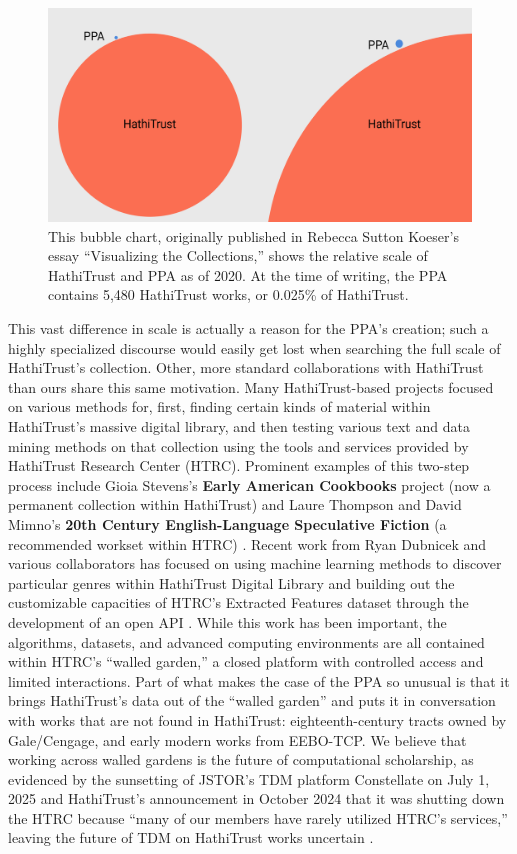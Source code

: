 \documentclass{anthology-ch}         %
\begin{document}
\begin{figure}
    \centering
    \includegraphics[width=0.75\linewidth]{figures/bubble-chart.png}
    \caption{This bubble chart, originally published in Rebecca Sutton Koeser’s essay “Visualizing the Collections,”\cite{koeser_visualizing_2020} shows the relative scale of HathiTrust and PPA as of 2020. At the time of writing, the PPA contains 5,480 HathiTrust works, or 0.025\% of HathiTrust. }
    \label{fig:bubble-chart}
\end{figure}
This vast difference in scale is actually a reason for the PPA’s creation; such a highly specialized discourse would easily get lost when searching the full scale of HathiTrust’s collection. Other, more standard collaborations with HathiTrust than ours share this same motivation. Many HathiTrust-based projects focused on various methods for, first, finding certain kinds of material within HathiTrust’s massive digital library, and then testing various text and data mining methods on that collection using the tools and services provided by HathiTrust Research Center (HTRC)\cite{noauthor_hathitrust_nodate}. Prominent examples of this two-step process include Gioia Stevens’s \textbf{Early American Cookbooks} project (now a permanent collection within HathiTrust) \cite{stevens_new_2017} and Laure Thompson and David Mimno’s \textbf{20th Century English-Language Speculative Fiction }(a recommended workset within HTRC) \cite{thompson_building_nodate} \cite{noauthor_recommended_nodate}. Recent work from Ryan Dubnicek and various collaborators has focused on using machine learning methods to discover particular genres within HathiTrust Digital Library \cite{parulian_uncovering_2022} \cite{dubnicek_ryan_piloting_2023} and building out the customizable capacities of HTRC’s Extracted Features dataset through the development of an open API \cite{john_a_walsh_library_nodate}. While this work has been important, the algorithms, datasets, and advanced computing environments are all contained within HTRC’s “walled garden,” a closed platform with controlled access and limited interactions. Part of what makes the case of the PPA so unusual is that it brings HathiTrust’s data out of the “walled garden” and puts it in conversation with works that are not found in HathiTrust: eighteenth-century tracts owned by Gale/Cengage, and early modern works from EEBO-TCP. We believe that working across walled gardens is the future of computational scholarship, as evidenced by the sunsetting of JSTOR’s TDM platform Constellate on July 1, 2025 \cite{noauthor_constellate_2019} and HathiTrust’s announcement in October 2024 that it was shutting down the HTRC because “many of our members have rarely utilized HTRC’s services,” leaving the future of TDM on HathiTrust works uncertain \cite{noauthor_plans_nodate}.
\end{document}

